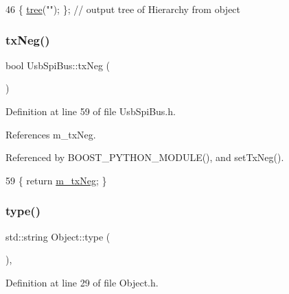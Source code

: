 \begin{DoxyCode}
46 \{ \hyperlink{classHierarchy_a594c294c5f60c230e106d522ed008212}{tree}(\textcolor{stringliteral}{""}); \};                     \textcolor{comment}{// output tree of Hierarchy from object}
\end{DoxyCode}
\mbox{\label{classUsbSpiBus_a08605d71903fc384ed119842833485f1}} 
\subsubsection{\texorpdfstring{tx\+Neg()}{txNeg()}}
{\footnotesize\ttfamily bool Usb\+Spi\+Bus\+::tx\+Neg (\begin{DoxyParamCaption}{ }\end{DoxyParamCaption})\hspace{0.3cm}{\ttfamily [inline]}}



Definition at line 59 of file Usb\+Spi\+Bus.\+h.



References m\+\_\+tx\+Neg.



Referenced by B\+O\+O\+S\+T\+\_\+\+P\+Y\+T\+H\+O\+N\+\_\+\+M\+O\+D\+U\+L\+E(), and set\+Tx\+Neg().


\begin{DoxyCode}
59 \{ \textcolor{keywordflow}{return} \hyperlink{classUsbSpiBus_a48528e7dcb036ecc1732581a89e16d10}{m\_txNeg}; \}
\end{DoxyCode}
\mbox{\label{classObject_a84f99f70f144a83e1582d1d0f84e4e62}} 
\subsubsection{\texorpdfstring{type()}{type()}}
{\footnotesize\ttfamily std\+::string Object\+::type (\begin{DoxyParamCaption}{ }\end{DoxyParamCaption})\hspace{0.3cm}{\ttfamily [inline]}, {\ttfamily [inherited]}}



Definition at line 29 of file Object.\+h.



